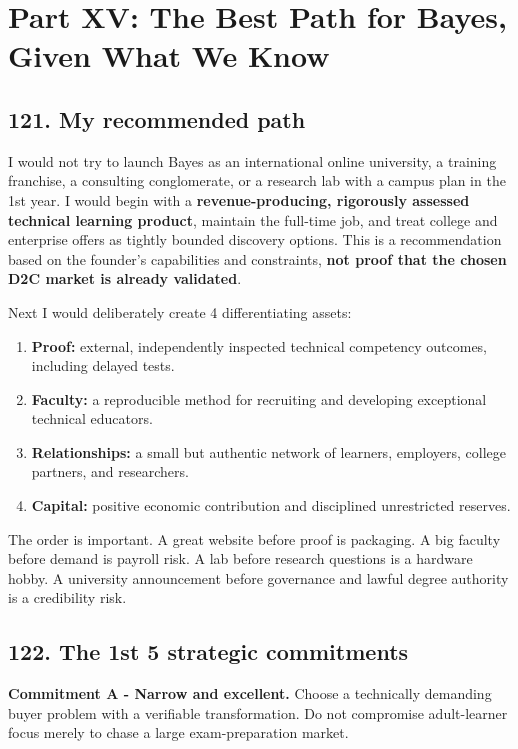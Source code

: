 
\section*{Part XV: The Best Path for Bayes, Given What We Know}

\subsection{121. My recommended path}

I would not try to launch Bayes as an international online university, a training franchise, a consulting conglomerate, or a research lab with a campus plan in the 1st year. I would begin with a \textbf{revenue-producing, rigorously assessed technical learning product}, maintain the full-time job, and treat college and enterprise offers as tightly bounded discovery options. This is a recommendation based on the founder's capabilities and constraints, \textbf{not proof that the chosen D2C market is already validated}.

Next I would deliberately create 4 differentiating assets:

\begin{enumerate}[leftmargin=*,itemsep=1.5pt]
  \item \textbf{Proof:} external, independently inspected technical competency outcomes, including delayed tests.
  \item \textbf{Faculty:} a reproducible method for recruiting and developing exceptional technical educators.
  \item \textbf{Relationships:} a small but authentic network of learners, employers, college partners, and researchers.
  \item \textbf{Capital:} positive economic contribution and disciplined unrestricted reserves.
\end{enumerate}

The order is important. A great website before proof is packaging. A big faculty before demand is payroll risk. A lab before research questions is a hardware hobby. A university announcement before governance and lawful degree authority is a credibility risk.

\subsection{122. The 1st 5 strategic commitments}

\textbf{Commitment A - Narrow and excellent.} Choose a technically demanding buyer problem with a verifiable transformation. Do not compromise adult-learner focus merely to chase a large exam-preparation market.

